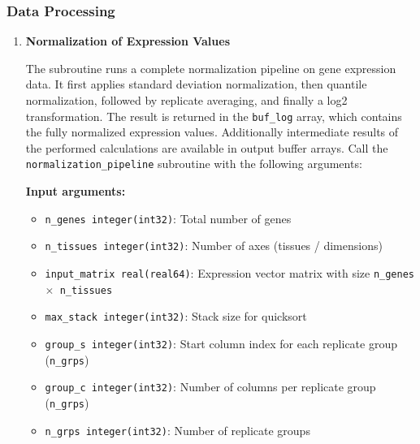 \subsubsection{Data Processing}
\begin{enumerate}
    \item \textbf{Normalization of Expression Values}
          
          The subroutine runs a complete normalization pipeline on gene expression data.
          It first applies standard deviation normalization, then quantile normalization,
          followed by replicate averaging, and finally a log2 transformation. The
          result is returned in the \texttt{buf\_log} array, which contains the
          fully normalized expression values. Additionally intermediate results of the
          performed calculations are available in output buffer arrays. Call the
          \texttt{normalization\_pipeline} subroutine with the following arguments:
          
          \textbf{Input arguments:}
          \begin{itemize}
            \item \texttt{n\_genes integer(int32)}: Total number of genes
                  
            \item \texttt{n\_tissues integer(int32)}: Number of axes (tissues /
                  dimensions)
                  
            \item \texttt{input\_matrix real(real64)}: Expression vector matrix with
                  size \texttt{n\_genes $\times$ n\_tissues}
                  
            \item \texttt{max\_stack integer(int32)}: Stack size for quicksort
                  
            \item \texttt{group\_s integer(int32)}: Start column index for each replicate
                  group (\texttt{n\_grps})
                  
            \item \texttt{group\_c integer(int32)}: Number of columns per replicate group
                  (\texttt{n\_grps})
                  
            \item \texttt{n\_grps integer(int32)}: Number of replicate groups
          \end{itemize}
          

\end{enumerate}
